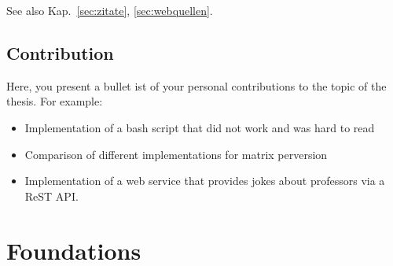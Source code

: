 \documentclass[12pt,oneside]{article}
\begin{document}
See also  Kap.~\ref{sec:zitate}, \ref{sec:webquellen}. 

\subsection{Contribution}
Here, you present a bullet ist of your personal contributions to the topic of the thesis. For example: 
\begin{itemize}
    \item Implementation of a bash script that did not work and was hard to read
    \item Comparison of different implementations for matrix perversion
    \item Implementation of a web service that provides jokes about professors via a ReST API.
\end{itemize}

\section{Foundations}\label{sec:grundlagen}
\end{document}
